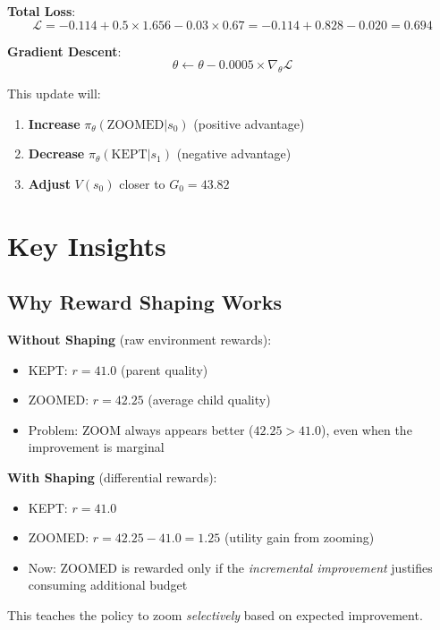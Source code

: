 \documentclass[11pt]{article}
\begin{document}
\textbf{Total Loss}:
\begin{equation}
\mathcal{L} = -0.114 + 0.5 \times 1.656 - 0.03 \times 0.67
= -0.114 + 0.828 - 0.020 = \boxed{0.694}
\end{equation}

\textbf{Gradient Descent}:
\begin{equation}
\theta \gets \theta - 0.0005 \times \nabla_\theta \mathcal{L}
\end{equation}

This update will:
\begin{enumerate}[nosep]
    \item \textbf{Increase} $\pi_\theta(\text{ZOOMED}|s_0)$ (positive advantage)
    \item \textbf{Decrease} $\pi_\theta(\text{KEPT}|s_1)$ (negative advantage)
    \item \textbf{Adjust} $V(s_0)$ closer to $G_0 = 43.82$
\end{enumerate}

\section{Key Insights}

\subsection{Why Reward Shaping Works}

\textbf{Without Shaping} (raw environment rewards):
\begin{itemize}[nosep]
    \item KEPT: $r = 41.0$ (parent quality)
    \item ZOOMED: $r = 42.25$ (average child quality)
    \item Problem: ZOOM always appears better ($42.25 > 41.0$), even when the improvement is marginal
\end{itemize}

\textbf{With Shaping} (differential rewards):
\begin{itemize}[nosep]
    \item KEPT: $r = 41.0$
    \item ZOOMED: $r = 42.25 - 41.0 = 1.25$ (utility gain from zooming)
    \item Now: ZOOMED is rewarded only if the \emph{incremental improvement} justifies consuming additional budget
\end{itemize}

This teaches the policy to zoom \emph{selectively} based on expected improvement.
\end{document}

